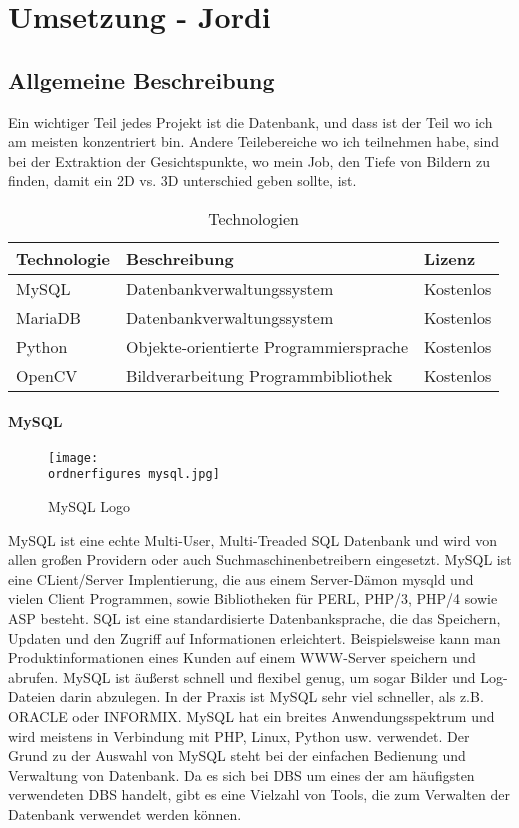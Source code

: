 \chapter{Umsetzung - Jordi}
\label{\docname}

\section{Allgemeine Beschreibung}
Ein wichtiger Teil jedes Projekt ist die Datenbank, und dass ist der Teil wo ich am meisten konzentriert bin. Andere Teilebereiche wo ich teilnehmen habe, sind bei der Extraktion der Gesichtspunkte, wo mein Job, den Tiefe von Bildern zu finden, damit ein 2D vs. 3D unterschied geben sollte, ist.

\begin{table}[ht]
	\centering
	\begin{tabular}{ |l|l|l| } 
		\hline		
		Technologie & Beschreibung & Lizenz \\ 
		\hline
		MySQL & Datenbankverwaltungssystem & Kostenlos \\ 
		\hline
		MariaDB & Datenbankverwaltungssystem & Kostenlos \\
		\hline 
		Python & Objekte-orientierte Programmiersprache & Kostenlos \\
		\hline 
		OpenCV &  Bildverarbeitung Programmbibliothek  & Kostenlos \\ 
		\hline
	\end{tabular}
	\caption{Technologien}
	\label{table:tech}
\end{table}
\subsubsection{MySQL}
\begin{figure}
	\centering
	\texttt{[image: \\ordnerfigures mysql.jpg]}
	\caption{ MySQL Logo}
	\label{fig:mysql}
	\cite{MySQLlogo}
\end{figure}
MySQL ist eine echte Multi-User, Multi-Treaded SQL Datenbank und wird von allen großen
Providern oder auch Suchmaschinenbetreibern eingesetzt. MySQL ist eine CLient/Server
Implentierung, die aus einem Server-Dämon mysqld und vielen Client Programmen, sowie
Bibliotheken für PERL, PHP/3, PHP/4 sowie ASP besteht.
SQL ist eine standardisierte Datenbanksprache, die das Speichern, Updaten und den Zugriff auf
Informationen erleichtert. Beispielsweise kann man Produktinformationen eines Kunden auf einem
WWW-Server speichern und abrufen. MySQL ist äußerst schnell und flexibel genug, um sogar Bilder
und Log-Dateien darin abzulegen. In der Praxis ist MySQL sehr viel schneller, als z.B. ORACLE oder INFORMIX.\cite{stepken1999mysql}
\bigbreak
MySQL hat ein breites Anwendungsspektrum und wird meistens in Verbindung mit PHP, Linux, Python usw. verwendet. Der Grund zu der Auswahl von MySQL steht bei der einfachen Bedienung und Verwaltung von Datenbank. Da es sich bei DBS um eines der am häufigsten verwendeten DBS handelt, gibt es eine Vielzahl von Tools, die zum Verwalten der Datenbank verwendet werden können.

